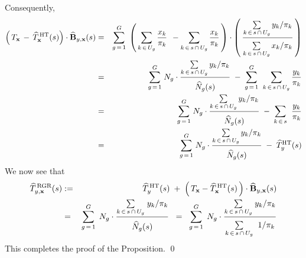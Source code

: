 Consequently,
\begin{eqnarray*}
\left(\,T_{\mathbf{x}} \,-\, \widehat{T}^{\,\textnormal{HT}}_{\mathbf{x}}(s)\right)
\cdot
\widehat{\mathbf{B}}_{y,\mathbf{x}}(s)
& = &
	\overset{G}{\underset{g\,=\,1}{\sum}}\;
	\left(\,
		\underset{k\,\in\,U_{g}}{\sum}\, \dfrac{x_{k}}{\pi_{k}}
		 \;\, -
		 \underset{k\,\in\,s\,\cap\,U_{g}}{\sum}\, \dfrac{x_{k}}{\pi_{k}}
	\,\right)
	\cdot
	\left(\,
		\dfrac{
			\underset{k\,\in\,s\,\cap\,U_{g}}{\sum}\, y_{k} / \pi_{k}
		}{
			\overset{{\color{white}.}}{\underset{k\,\in\,s\,\cap\,U_{g}}{\sum}\, x_{k}/\pi_{k}}
		}
	\,\right)
\\
& = &
	\overset{G}{\underset{g\,=\,1}{\sum}}\;
	N_{g} \cdot \dfrac{ \underset{k\,\in\,s\,\cap\,U_{g}}{\sum}\, y_{k}/\pi_{k} }{\overset{{\color{white}.}}{\widehat{N}_{g}(s)}}
	\; - \;
	\overset{G}{\underset{g\,=\,1}{\sum}}\;\;
	\underset{k\,\in\,s\,\cap\,U_{g}}{\sum}\, \dfrac{y_{k}}{\pi_{k}}
\\
& = &
	\overset{G}{\underset{g\,=\,1}{\sum}}\;
	N_{g} \cdot \dfrac{ \underset{k\,\in\,s\,\cap\,U_{g}}{\sum}\, y_{k}/\pi_{k} }{\overset{{\color{white}.}}{\widehat{N}_{g}(s)}}
	\; - \;
	\underset{k\,\in\,s}{\sum}\;\;\dfrac{y_{k}}{\pi_{k}}
\\
& = &
	\overset{G}{\underset{g\,=\,1}{\sum}}\;
	N_{g} \cdot \dfrac{ \underset{k\,\in\,s\,\cap\,U_{g}}{\sum}\, y_{k}/\pi_{k} }{\overset{{\color{white}.}}{\widehat{N}_{g}(s)}}
	\; - \;
	\widehat{T}^{\textnormal{HT}}_{y}(s)
\end{eqnarray*}
We now see that
\begin{eqnarray*}
\widehat{T}^{\,\textnormal{RGR}}_{y,\mathbf{x}}(s)
& := &
	\widehat{T}^{\,\textnormal{HT}}_{y}(s)
	\; + \;
	\left(\,T_{\mathbf{x}} - \widehat{T}^{\,\textnormal{HT}}_{\mathbf{x}}(s) \,\right)
	\cdot
	\widehat{\mathbf{B}}_{y,\mathbf{x}}(s)
\\
& = &
	\overset{G}{\underset{g\,=\,1}{\sum}}\;\, N_{g}
	\cdot
	\dfrac{
		\underset{k\,\in\,s\,\cap\,U_{g}}{\sum}\;y_{k}/\pi_{k}
		}{
		\overset{{\color{white}.}}{\widehat{N}_{g}(s)}
		}
\;\; = \;\;
	\overset{G}{\underset{g\,=\,1}{\sum}}\;\, N_{g}
	\cdot
	\dfrac{
		\underset{k\,\in\,s\,\cap\,U_{g}}{\sum}\;y_{k}/\pi_{k}
		}{
		\underset{k\,\in\,s\,\cap\,U_{g}}{\overset{{\color{white}.}}{\sum}}\;\;1/\pi_{k}
		}
\end{eqnarray*}
This completes the proof of the Proposition.
\qed


\renewcommand{\theenumi}{\roman{enumi}}
\renewcommand{\labelenumi}{\textnormal{(\theenumi)}$\;\;$}

